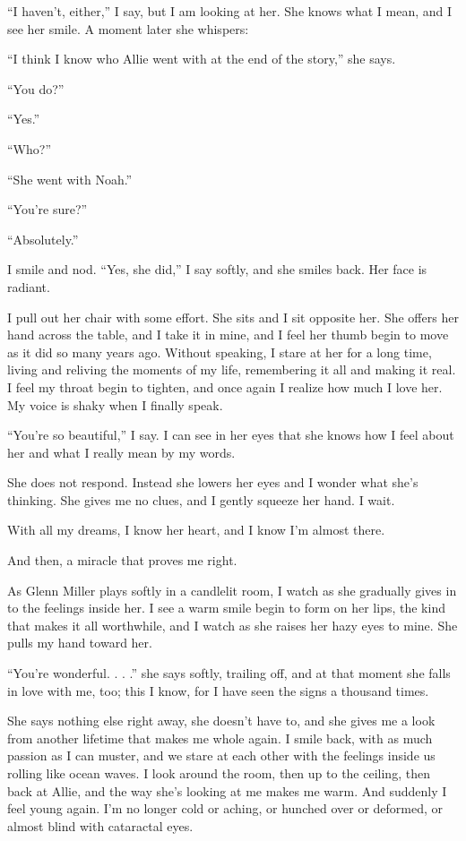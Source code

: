 \documentclass[10pt, twoside, openright]{book}
\begin{document}
``I haven't, either,'' I say, but I am looking at her. She knows what I
mean, and I see her smile. A moment later she whispers:


``I think I know who Allie went with at the end of the story,'' she
says.

``You do?''

``Yes.''

``Who?''

``She went with Noah.''

``You're sure?''

``Absolutely.''


I smile and nod. ``Yes, she did,'' I say softly, and she smiles back.
Her face is radiant.

I pull out her chair with some effort. She sits and I sit opposite her.
She offers her hand across the table, and I take it in mine, and I feel
her thumb begin to move as it did so many years ago. Without speaking, I
stare at her for a long time, living and reliving the moments of my
life, remembering it all and making it real. I feel my throat begin to
tighten, and once again I realize how much I love her. My voice is shaky
when I finally speak.

``You're so beautiful,'' I say. I can see in her eyes that she knows how
I feel about her and what I really mean by my words.

She does not respond. Instead she lowers her eyes and I wonder what
she's thinking. She gives me no clues, and I gently squeeze her hand. I
wait.

With all my dreams, I know her heart, and I know I'm almost there.


And then, a miracle that proves me right.


As Glenn Miller plays softly in a candlelit room, I watch as she
gradually gives in to the feelings inside her. I see a warm smile begin
to form on her lips, the kind that makes it all worthwhile, and I watch
as she raises her hazy eyes to mine. She pulls my hand toward her.

``You're wonderful. . . .'' she says softly, trailing off, and at that
moment she falls in love with me, too; this I know, for I have seen the
signs a thousand times.

She says nothing else right away, she doesn't have to, and she gives me
a look from another lifetime that makes me whole again. I smile back,
with as much passion as I can muster, and we stare at each other with
the feelings inside us rolling like ocean waves. I look around the room,
then up to the ceiling, then back at Allie, and the way she's looking at
me makes me warm. And suddenly I feel young again. I'm no longer cold or
aching, or hunched over or deformed, or almost blind with cataractal
eyes.
\end{document}
